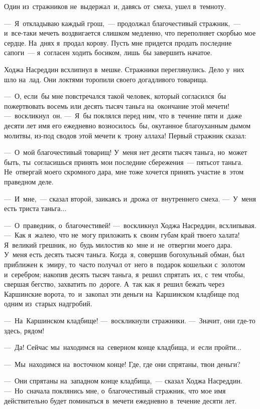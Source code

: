 \documentclass[12pt,a4paper]{book}
\begin{document}
Один из~стражников не~выдержал~и, давясь от~смеха, ушел в~темноту.

—~Я~откладываю каждый грош,~— продолжал благочестивый стражник,~— и~все-таки мечеть воздвигается слишком медленно, что переполняет скорбью мое сердце. На~днях я~продал корову. Пусть мне придется продать последние сапоги~— я~согласен ходить босиком, лишь~бы завершить начатое.

Ходжа Насреддин всхлипнул в~мешке. Стражники переглянулись. Дело у~них шло на~лад. Они локтями торопили своего догадливого товарища.

—~О, если~бы мне повстречался такой человек, который согласился~бы пожертвовать восемь или десять тысяч таньга на~окончание этой мечети! —~воскликнул~он. —~Я~бы поклялся перед ним, что в~течение пяти и~даже десяти лет имя его ежедневно возносилось~бы, окутанное благоуханным дымом молитвы, из-под сводов этой мечети к~трону аллаха! Первый стражник сказал:

—~О~мой благочестивый товарищ! У~меня нет десяти тысяч таньга, но~может быть, ты~согласишься принять мои последние сбережения~— пятьсот таньга. Не~отвергай моего скромного дара, мне тоже хочется принять участие в~этом праведном деле.

—~И~мне,~— сказал второй, заикаясь и~дрожа от~внутреннего смеха. —~У~меня есть триста таньга...

—~О~праведник, о~благочестивей! —~воскликнул Ходжа Насреддин, всхлипывая. —~Как я~жалею, что не~могу приложить к~своим губам край твоего халата! Я~великий грешник, но~будь милостив ко~мне и~не~отвергни моего дара. У~меня есть десять тысяч таньга. Когда~я, совершив богохульный обман, был приближен к~эмиру, то~часто получал от~него в~подарок кошельки с~золотом и~серебром; накопив десять тысяч таньга, я~решил спрятать~их, с~тем чтобы, свершая бегство, захватить по~дороге. А~так как я~решил бежать через Каршинские ворота, то~и~закопал эти деньги на~Каршинском кладбище под одним из~старых надгробий.

—~На~Каршинском кладбище! —~воскликнули стражники. —~Значит, они где-то здесь, рядом!

—~Да! Сейчас мы~находимся на~северном конце кладбища, и~если пройти...

—~Мы~находимся на~восточном конце! Где, где они спрятаны, твои деньги?

—~Они спрятаны на~западном конце кладбища,~— сказал Ходжа Насреддин. —~Но~сначала поклянись мне, о~благочестивый стражник, что мое имя действительно будет поминаться в~мечети ежедневно в~течение десяти лет.
\end{document}
